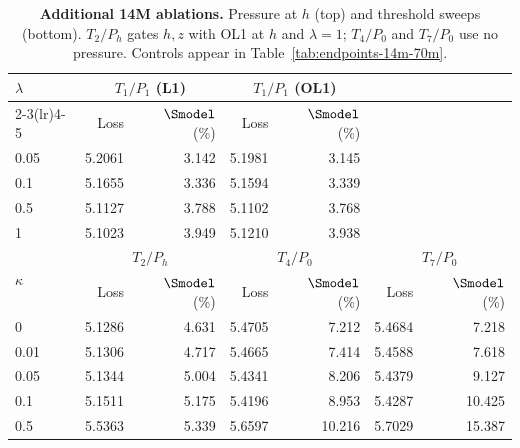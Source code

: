 \begin{table}[!htbp]
\centering\small
\setlength{\tabcolsep}{6pt}
\renewcommand{\arraystretch}{1.05}
\caption{\textbf{Additional 14M ablations.} Pressure at $h$ (top) and threshold sweeps (bottom). $T_2/P_h$ gates $h,z$ with OL1 at $h$ and $\lambda=1$; $T_4/P_0$ and $T_7/P_0$ use no pressure. Controls appear in Table~\ref{tab:endpoints-14m-70m}.}
\label{tab:endpoints-14m-only}
\begin{tabular}{@{}lrrrrrr@{}}
\toprule
\multirow{2}{*}{$\lambda$} & \multicolumn{2}{c}{$T_1/P_1$ (L1)} & \multicolumn{2}{c}{$T_1/P_1$ (OL1)} & \multicolumn{2}{c}{} \\
\cmidrule(lr){2-3}\cmidrule(lr){4-5}
 & Loss & $\Smodel$ (\%) & Loss & $\Smodel$ (\%) & \multicolumn{2}{c}{} \\
\midrule
0.05 & 5.2061 & 3.142 & 5.1981 & 3.145 & \multicolumn{2}{c}{} \\
0.1 & 5.1655 & 3.336 & 5.1594 & 3.339 & \multicolumn{2}{c}{} \\
0.5 & 5.1127 & 3.788 & 5.1102 & 3.768 & \multicolumn{2}{c}{} \\
1 & 5.1023 & 3.949 & 5.1210 & 3.938 & \multicolumn{2}{c}{} \\
\midrule
\multirow{2}{*}{$\kappa$} & \multicolumn{2}{c}{$T_2/P_h$} & \multicolumn{2}{c}{$T_4/P_0$} & \multicolumn{2}{c}{$T_7/P_0$} \\
\cmidrule(lr){2-3}\cmidrule(lr){4-5}\cmidrule(l){6-7}
 & Loss & $\Smodel$ (\%) & Loss & $\Smodel$ (\%) & Loss & $\Smodel$ (\%) \\
\midrule
0 & 5.1286 & 4.631 & 5.4705 & 7.212 & 5.4684 & 7.218 \\
0.01 & 5.1306 & 4.717 & 5.4665 & 7.414 & 5.4588 & 7.618 \\
0.05 & 5.1344 & 5.004 & 5.4341 & 8.206 & 5.4379 & 9.127 \\
0.1 & 5.1511 & 5.175 & 5.4196 & 8.953 & 5.4287 & 10.425 \\
0.5 & 5.5363 & 5.339 & 5.6597 & 10.216 & 5.7029 & 15.387 \\
\bottomrule
\end{tabular}
\end{table}

